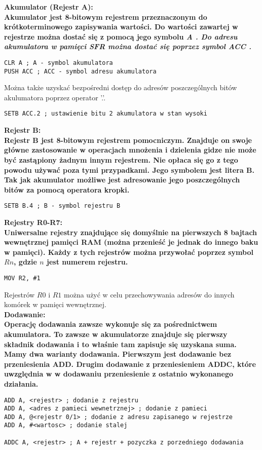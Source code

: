 \documentclass[a4paper,12pt]{article}
\newcommand{\h}[1]{\noindent \bf #1 \rm \\ \noindent}
\newcommand{\italic}[1]{\it #1 \rm}
\begin{document}
\h{Akumulator (Rejestr A):}
Akumulator jest 8-bitowym rejestrem przeznaczonym do krótkoterminowego zapisywania wartości. Do wartości zawartej w rejestrze można dostać się z pomocą jego symbolu \italic{A}. Do adresu akumulatora w pamięci SFR można dostać się poprzez symbol \italic{ACC}.
\begin{lstlisting}[language={[x86masm]Assembler}]
CLR A ; A - symbol akumulatora
PUSH ACC ; ACC - symbol adresu akumulatora
\end{lstlisting}
\vspace{5mm}

\noindent
Można także uzyskać bezpośredni dostęp do adresów poszczególnych bitów akulumatora poprzez operator '.'.
\begin{lstlisting}[language={[x86masm]Assembler}]
SETB ACC.2 ; ustawienie bitu 2 akumulatora w stan wysoki
\end{lstlisting}
\vspace{5mm}

\h{Rejestr B:}
Rejestr B jest 8-bitowym rejestrem pomocniczym. Znajduje on swoje główne zastosowanie w operacjach mnożenia i dzielenia gidze nie może być zastąpiony żadnym innym rejestrem. Nie opłaca się go z tego powodu używać poza tymi przypadkami. Jego symbolem jest litera B. Tak jak akumulator możliwe jest adresowanie jego poszczególnych bitów za pomocą operatora kropki.
\begin{lstlisting}[language={[x86masm]Assembler}]
SETB B.4 ; B - symbol rejestru B
\end{lstlisting}
\vspace{5mm}

\h{Rejestry R0-R7:}
Uniwersalne rejestry znajdujące się domyślnie na pierwszych 8 bajtach wewnętrznej pamięci RAM (można przenieść je jednak do innego baku w pamięci). Każdy z tych rejestrów można przywołać poprzez symbol $Rn$, gdzie $n$ jest numerem rejestru.
\begin{lstlisting}[language={[x86masm]Assembler}]
MOV R2, #1
\end{lstlisting}
\vspace{5mm}

\noindent
Rejestrów $R0$ i $R1$ można użyć w celu przechowywania adresów do innych komórek w pamięci wewnętrznej. \\

\h{Dodawanie:}
Operację dodawania zawsze wykonuje się za pośrednictwem akumulatora. To zawsze w akumulatorze znajduje się pierwszy składnik dodawania i to właśnie tam zapisuje się uzyskana suma. Mamy dwa warianty dodawania. Pierwszym jest dodawanie bez przeniesienia ADD. Drugim dodawanie z przeniesieniem ADDC, które uwzględnia w w dodawaniu przeniesienie z ostatnio wykonanego działania.
\begin{lstlisting}[language={[x86masm]Assembler}]
ADD A, <rejestr> ; dodanie z rejestru
ADD A, <adres z pamieci wewnetrznej> ; dodanie z pamieci
ADD A, @<rejestr 0/1> ; dodanie z adresu zapisanego w rejestrze
ADD A, #<wartosc> ; dodanie stalej

ADDC A, <rejestr> ; A + rejestr + pozyczka z porzedniego dodawania
\end{lstlisting}
\vspace{5mm}
\end{document}
